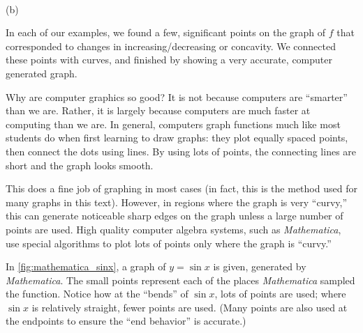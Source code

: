 \begin{example}
\begin{enumerate}
{
\\[10pt](b)}
%
\end{enumerate}
\end{example}

In each of our examples, we found a few, significant points on the graph of $f$ that corresponded to changes in increasing/decreasing or concavity. We connected these points with curves, and finished by showing a very accurate, computer generated graph. 

Why are computer graphics so good? It is not because computers are ``smarter'' than we are. Rather, it is largely because computers are much faster at computing than we are. In general, computers graph functions much like most students do when first learning to draw graphs: they plot equally spaced points, then connect the dots using lines. By using lots of points, the connecting lines are short and the graph looks smooth. 

This does a fine job of graphing in most cases (in fact, this is the method used for many graphs in this text). However, in regions where the graph is very ``curvy,'' this can generate noticeable sharp edges on the graph unless a large number of points are used. High quality computer algebra systems, such as \textit{Mathematica}, use special algorithms to plot lots of points only where the graph is ``curvy.''

In \autoref{fig:mathematica_sinx}, a graph of $y=\sin x$ is given, generated by \textit{Mathematica}. The small points represent each of the places \textit{Mathematica} sampled the function. Notice how at the ``bends'' of $\sin x$, lots of points are used; where $\sin x$ is relatively straight, fewer points are used. (Many points are also used at the endpoints to ensure the ``end behavior'' is accurate.) 

